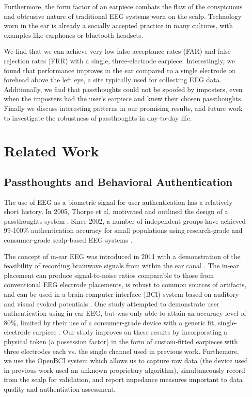 \documentclass{sigchi}
\begin{document}
Furthermore, the form factor of an earpiece combats the flaw of the conspicuous and obtrusive nature of traditional EEG systems worn on the scalp. Technology worn in the ear is already a socially accepted practice in many cultures, with examples like earphones or bluetooth headsets.

We find that we can achieve very low false acceptance rates (FAR) and false rejection rates (FRR) with a single, three-electrode earpiece. Interestingly, we found that performance improves in the ear compared to a single electrode on forehead above the left eye, a site typically used for collecting EEG data. Additionally, we find that passthoughts could not be spoofed by imposters, even when the imposters had the user's earpiece and knew their chosen passthoughts. Finally we discuss interesting patterns in our promising results, and future work to investigate the robustness of passthoughts in day-to-day life.

\section{Related Work}

\subsection{Passthoughts and Behavioral Authentication}
The use of EEG as a biometric signal for user authentication has a relatively short history.
In 2005, Thorpe et al. motivated and outlined the design of a passthoughts system \cite{Thorpe2005}.
Since 2002, a number of independent groups have achieved 99-100\% authentication accuracy for small populations using research-grade and consumer-grade scalp-based EEG systems \cite{Poulos2002,Marcel2007a,Ashby2011,Chuang2013b}.

The concept of in-ear EEG was introduced in 2011 with a demonstration of the feasibility of recording brainwave signals from within the ear canal \cite{Looney2011}. The in-ear placement can produce signal-to-noise ratios comparable to those from conventional EEG electrode placements, is robust to common sources of artifacts, and can be used in a brain-computer interface (BCI) system based on auditory and visual evoked potentials \cite{Kidmose2013a}. One study attempted to demonstrate user authentication using in-ear EEG, but was only able to attain an accuracy level of 80\%, limited by their use of a consumer-grade device with a generic fit, single-electrode earpiece \cite{curran2016passthoughts}. Our study improves on these results by incorporating a physical token (a possession factor) in the form of custom-fitted earpieces with three electrodes each vs. the single channel used in previous work. Furthemore, we use the OpenBCI system which allows us to capture raw data (the device used in previous work used an unknown proprietary algorithm), simultaneously record from the scalp for validation, and report impedance measures important to data quality and authentiation assessment.
\end{document}
